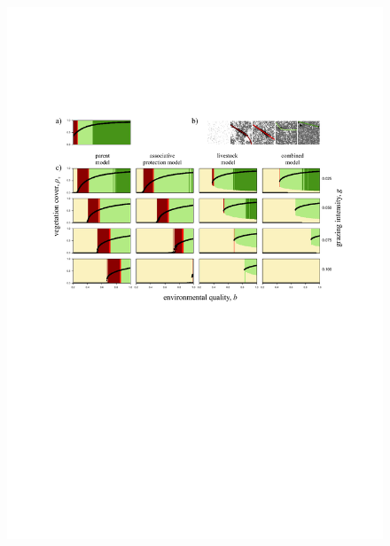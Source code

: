 \begin{figure}[h]%
\includegraphics[width=\columnwidth]{figures/fig3.pdf}%
\caption{}%
\label{}%
\end{figure}


